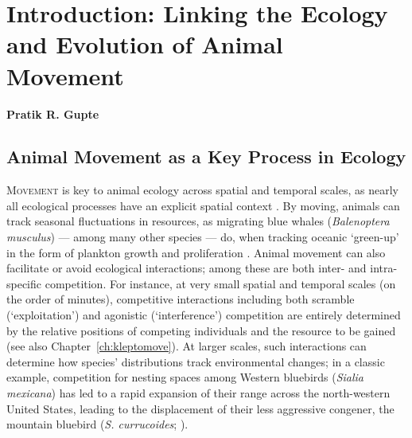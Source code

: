 
{}%
\chapter{Introduction: Linking the Ecology and Evolution of Animal Movement}\label{ch:introduction}

\textbf{Pratik R. Gupte}

\medskip


\section*{Animal Movement as a Key Process in Ecology}

\lettrine{M}{ovement} is key to animal ecology across spatial and temporal scales, as nearly all ecological processes have an explicit spatial context \citep{nathan2008a}.
By moving, animals can track seasonal fluctuations in resources, as migrating blue whales (\emph{Balenoptera musculus}) --- among many other species --- do, when tracking oceanic `green-up' in the form of plankton growth and proliferation \parencite{abrahms2021a,abrahms2019}.
Animal movement can also facilitate or avoid ecological interactions; among these are both inter- and intra-specific competition.
For instance, at very small spatial and temporal scales (on the order of minutes), competitive interactions including both scramble (`exploitation') and agonistic (`interference') competition \parencite[][]{keddy2001,birch1957} are entirely determined by the relative positions of competing individuals and the resource to be gained (see also Chapter~\ref{ch:kleptomove}).
At larger scales, such interactions can determine how species' distributions track environmental changes; in a classic example, competition for nesting spaces among Western bluebirds (\emph{Sialia mexicana}) has led to a rapid expansion of their range across the north-western United States, leading to the displacement of their less aggressive congener, the mountain bluebird (\emph{S. currucoides}; \cite{duckworth2007}).

